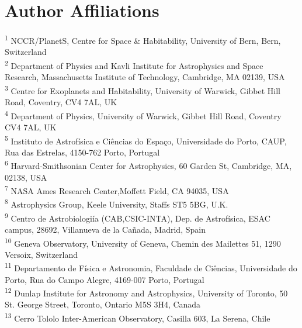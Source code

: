 \documentclass[fleqn,usenatbib]{mnras}
\begin{document}
\section{Author Affiliations}\label{sec:affiliations}
\textsuperscript{\hypertarget{affil_1}{1}} NCCR/PlanetS, Centre for Space \& Habitability, University of Bern, Bern, Switzerland\\
\textsuperscript{\hypertarget{affil_2}{2}} Department of Physics and Kavli Institute for Astrophysics and Space Research, Massachusetts Institute of Technology, Cambridge, MA 02139, USA\\
\textsuperscript{\hypertarget{affil_3}{3}} Centre for Exoplanets and Habitability, University of Warwick, Gibbet Hill Road, Coventry, CV4 7AL, UK\\
\textsuperscript{\hypertarget{affil_4}{4}} Department of Physics, University of Warwick, Gibbet Hill Road, Coventry CV4 7AL, UK\\
\textsuperscript{\hypertarget{affil_5}{5}} Instituto de Astrof\'isica e Ci\^encias do Espa\c{c}o, Universidade do Porto, CAUP, Rua das Estrelas, 4150-762 Porto, Portugal\\
\textsuperscript{\hypertarget{affil_6}{6}} Harvard-Smithsonian Center for Astrophysics, 60 Garden St, Cambridge, MA, 02138, USA\\
\textsuperscript{\hypertarget{affil_7}{7}} NASA Ames Research Center,Moffett Field, CA 94035, USA\\
\textsuperscript{\hypertarget{affil_8}{8}} Astrophysics Group, Keele University, Staffs ST5 5BG, U.K. \\
\textsuperscript{\hypertarget{affil_9}{9}} Centro de Astrobiologi\'ia (CAB,CSIC-INTA), Dep. de Astrof\'isica, ESAC campus, 28692, Villanueva de la Ca\~nada, Madrid, Spain\\
\textsuperscript{\hypertarget{affil_10}{10}} Geneva Observatory, University of Geneva, Chemin des Mailettes 51, 1290 Versoix, Switzerland\\
\textsuperscript{\hypertarget{affil_11}{11}} Departamento de F\'isica e Astronomia, Faculdade de Ci\^{e}ncias, Universidade do Porto, Rua do Campo Alegre, 4169-007 Porto, Portugal\\
\textsuperscript{\hypertarget{affil_12}{12}} Dunlap Institute for Astronomy and Astrophysics, University of Toronto, 50 St. George Street, Toronto, Ontario M5S 3H4, Canada\\
\textsuperscript{\hypertarget{affil_13}{13}} Cerro Tololo Inter-American Observatory, Casilla 603, La Serena, Chile\\
\end{document}

